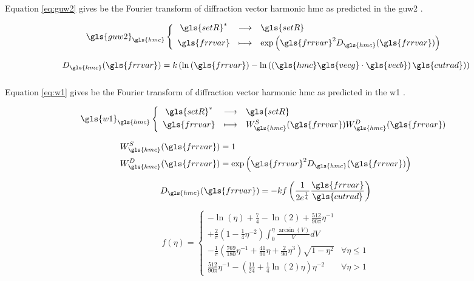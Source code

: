 \subsubsection{}

Equation \eqref{eq:guw2} gives be the Fourier transform of diffraction vector harmonic \gls{hmc} as predicted in the \gls{guw2} \cite{GUW1988}.

\begin{equation}
  \define{
    \gls{guw2}_{\gls{hmc}}
  }{
    \gls{setR}^*
  }{
    \gls{setR}
  }{
    \gls{frrvar}
  }{
    \exp\left( \gls{frrvar}^2 D_{\gls{hmc}}(\gls{frrvar}) \right)
  }
  \label{eq:guw2}
\end{equation}

\begin{equation}
  D_{\gls{hmc}}(\gls{frrvar}) =
    k \left( \ln \left( \gls{frrvar} \right) - \ln\left( \left( \gls{hmc} \gls{vecg} \cdot \gls{vecb} \right) \gls{cutrad} \right) \right)
\end{equation}

\subsubsection{}

Equation \eqref{eq:w1} gives be the Fourier transform of diffraction vector harmonic \gls{hmc} as predicted in the \gls{w1} \cite{W1970}.

\begin{equation}
  \define{
    \gls{w1}_{\gls{hmc}}
  }{
    \gls{setR}^*
  }{
    \gls{setR}
  }{
    \gls{frrvar}
  }{
    W_{\gls{hmc}}^S(\gls{frrvar}) W_{\gls{hmc}}^D(\gls{frrvar})
  }
  \label{eq:w1}
\end{equation}

\begin{align}
  W_{\gls{hmc}}^S(\gls{frrvar}) &= 1 \\
  W_{\gls{hmc}}^D(\gls{frrvar}) &= \exp\left( \gls{frrvar}^2 D_{\gls{hmc}}(\gls{frrvar}) \right)
\end{align}

\begin{equation}
  D_{\gls{hmc}}(\gls{frrvar}) =
    - k f \left( \frac{1}{2e^\frac{1}{4}} \frac{\gls{frrvar}}{\gls{cutrad}} \right)
\end{equation}

\medskip

\begin{equation}
  f(\eta) =
    \begin{cases}
      - \ln(\eta) + \frac{7}{4} - \ln(2) + \frac{512}{90 \pi} \eta^{-1} \\[5mm]
      + \frac{2}{\pi} \left( 1 - \frac{1}{4}\eta^{-2} \right) \int_0^\eta \frac{\arcsin(V)}{V} dV \\[5mm]
      - \frac{1}{\pi} \left( \frac{769}{180} \eta^{-1} + \frac{41}{90} \eta + \frac{2}{90}\eta^3 \right) \sqrt{ 1 - \eta^2 }
      & \forall \eta \leq 1 \\[1cm]
      \frac{512}{90 \pi} \eta^{-1} - \left( \frac{11}{24} + \frac{1}{4} \ln(2) \eta \right) \eta^{-2}
      & \forall \eta > 1
    \end{cases}
\end{equation}

